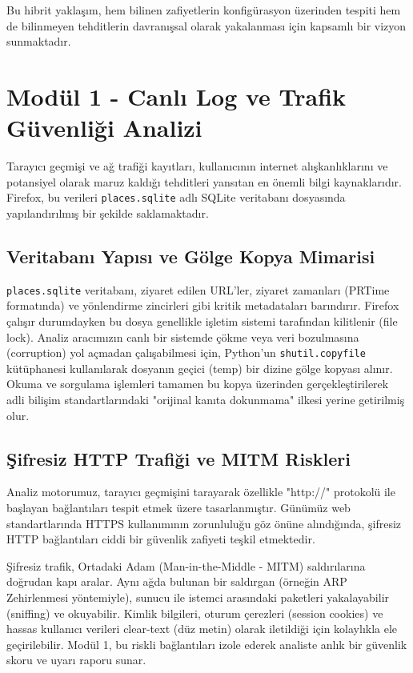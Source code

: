 \documentclass[12pt,a4paper]{article}
\begin{document}
Bu hibrit yaklaşım, hem bilinen zafiyetlerin konfigürasyon üzerinden tespiti hem de bilinmeyen tehditlerin davranışsal olarak yakalanması için kapsamlı bir vizyon sunmaktadır.
\clearpage

\section{Modül 1 - Canlı Log ve Trafik Güvenliği Analizi}

Tarayıcı geçmişi ve ağ trafiği kayıtları, kullanıcının internet alışkanlıklarını ve potansiyel olarak maruz kaldığı tehditleri yansıtan en önemli bilgi kaynaklarıdır. Firefox, bu verileri \texttt{places.sqlite} adlı SQLite veritabanı dosyasında yapılandırılmış bir şekilde saklamaktadır.

\subsection{Veritabanı Yapısı ve Gölge Kopya Mimarisi}
\texttt{places.sqlite} veritabanı, ziyaret edilen URL'ler, ziyaret zamanları (PRTime formatında) ve yönlendirme zincirleri gibi kritik metadataları barındırır. Firefox çalışır durumdayken bu dosya genellikle işletim sistemi tarafından kilitlenir (file lock). Analiz aracımızın canlı bir sistemde çökme veya veri bozulmasına (corruption) yol açmadan çalışabilmesi için, Python'un \texttt{shutil.copyfile} kütüphanesi kullanılarak dosyanın geçici (temp) bir dizine gölge kopyası alınır. Okuma ve sorgulama işlemleri tamamen bu kopya üzerinden gerçekleştirilerek adli bilişim standartlarındaki "orijinal kanıta dokunmama" ilkesi yerine getirilmiş olur.

\subsection{Şifresiz HTTP Trafiği ve MITM Riskleri}
Analiz motorumuz, tarayıcı geçmişini tarayarak özellikle "http://" protokolü ile başlayan bağlantıları tespit etmek üzere tasarlanmıştır. Günümüz web standartlarında HTTPS kullanımının zorunluluğu göz önüne alındığında, şifresiz HTTP bağlantıları ciddi bir güvenlik zafiyeti teşkil etmektedir.

Şifresiz trafik, Ortadaki Adam (Man-in-the-Middle - MITM) saldırılarına doğrudan kapı aralar. Aynı ağda bulunan bir saldırgan (örneğin ARP Zehirlenmesi yöntemiyle), sunucu ile istemci arasındaki paketleri yakalayabilir (sniffing) ve okuyabilir. Kimlik bilgileri, oturum çerezleri (session cookies) ve hassas kullanıcı verileri clear-text (düz metin) olarak iletildiği için kolaylıkla ele geçirilebilir. Modül 1, bu riskli bağlantıları izole ederek analiste anlık bir güvenlik skoru ve uyarı raporu sunar.
\clearpage
\end{document}
